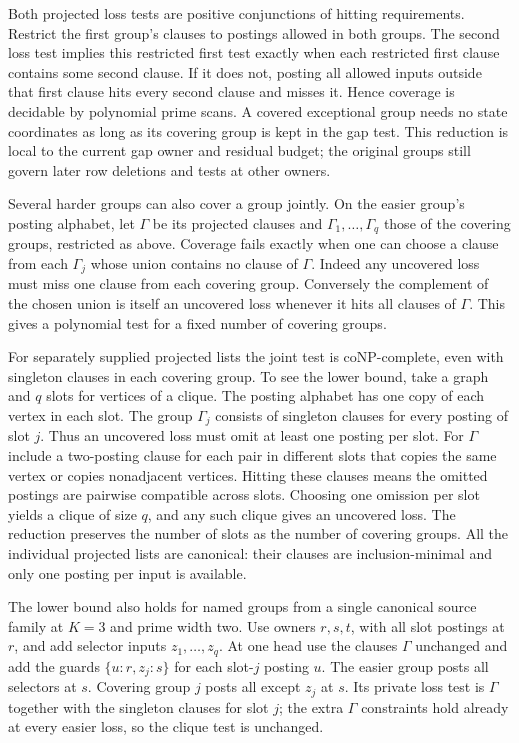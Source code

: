 Both projected loss tests are positive conjunctions
of hitting requirements. Restrict the first group's
clauses to postings allowed in both groups. The
second loss test implies this restricted first test
exactly when each restricted first clause contains
some second clause. If it does not, posting all
allowed inputs outside that first clause hits every
second clause and misses it. Hence coverage is
decidable by polynomial prime scans. A covered
exceptional group needs no state coordinates as long
as its covering group is kept in the gap test. This
reduction is local to the current gap owner and
residual budget; the original groups still govern
later row deletions and tests at other owners.

Several harder groups can also cover a group jointly.
On the easier group's posting alphabet, let $\Gamma$
be its projected clauses and $\Gamma_1,\ldots,\Gamma_q$
those of the covering groups, restricted as above.
Coverage fails exactly when one can choose a clause
from each $\Gamma_j$ whose union contains no clause
of $\Gamma$. Indeed any uncovered loss must miss
one clause from each covering group. Conversely the
complement of the chosen union is itself an uncovered
loss whenever it hits all clauses of $\Gamma$.
This gives a polynomial test for a fixed number of
covering groups.

For separately supplied projected lists the joint
test is coNP-complete, even with singleton clauses
in each covering group. To see the lower bound, take
a graph and $q$ slots for vertices of a clique. The
posting alphabet has one copy of each vertex in each
slot. The group $\Gamma_j$ consists of singleton
clauses for every posting of slot $j$. Thus an
uncovered loss must omit at least one posting per
slot. For $\Gamma$ include a two-posting clause for
each pair in different slots that copies the same
vertex or copies nonadjacent vertices. Hitting these
clauses means the omitted postings are pairwise
compatible across slots. Choosing one omission per
slot yields a clique of size $q$, and any such clique
gives an uncovered loss. The reduction preserves
the number of slots as the number of covering groups.
All the individual projected lists are canonical:
their clauses are inclusion-minimal and only
one posting per input is available.

The lower bound also holds for named groups from a
single canonical source family at $K=3$ and prime
width two. Use owners $r,s,t$, with all slot postings
at $r$, and add selector inputs $z_1,\ldots,z_q$.
At one head use the clauses $\Gamma$ unchanged and
add the guards $\{u:r,z_j:s\}$ for each slot-$j$
posting $u$. The easier group posts all selectors
at $s$. Covering group $j$ posts all except $z_j$
at $s$. Its private loss test is $\Gamma$ together
with the singleton clauses for slot $j$; the extra
$\Gamma$ constraints hold already at every easier
loss, so the clique test is unchanged.

